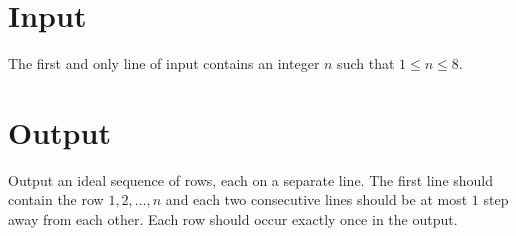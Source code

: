 \section*{Input}

The first and only line of input contains an integer $n$ such that $1 \leq n \leq 8$.

\section*{Output}

Output an ideal sequence of rows, each on a separate line. The first line should contain the row $1, 2,
\dots, n$ and each two consecutive lines should be at most $1$ step away from each other. Each row
should occur exactly once in the output.
